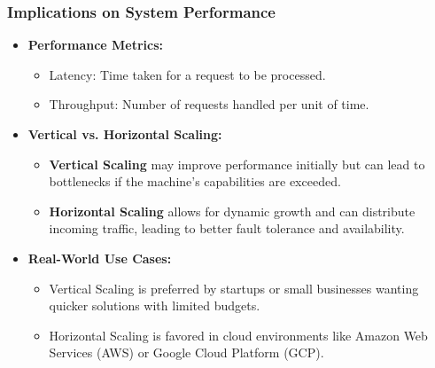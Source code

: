 \documentclass{beamer}
\begin{document}
\begin{frame}[fragile]
    \frametitle{Implications on System Performance}
    \begin{itemize}
        \item \textbf{Performance Metrics:}
            \begin{itemize}
                \item Latency: Time taken for a request to be processed.
                \item Throughput: Number of requests handled per unit of time.
            \end{itemize}
        \item \textbf{Vertical vs. Horizontal Scaling:}
            \begin{itemize}
                \item \textbf{Vertical Scaling} may improve performance initially but can lead to bottlenecks if the machine's capabilities are exceeded.
                \item \textbf{Horizontal Scaling} allows for dynamic growth and can distribute incoming traffic, leading to better fault tolerance and availability.
            \end{itemize}
        \item \textbf{Real-World Use Cases:}
            \begin{itemize}
                \item Vertical Scaling is preferred by startups or small businesses wanting quicker solutions with limited budgets.
                \item Horizontal Scaling is favored in cloud environments like Amazon Web Services (AWS) or Google Cloud Platform (GCP).
            \end{itemize}
    \end{itemize}
\end{frame}
\end{document}
